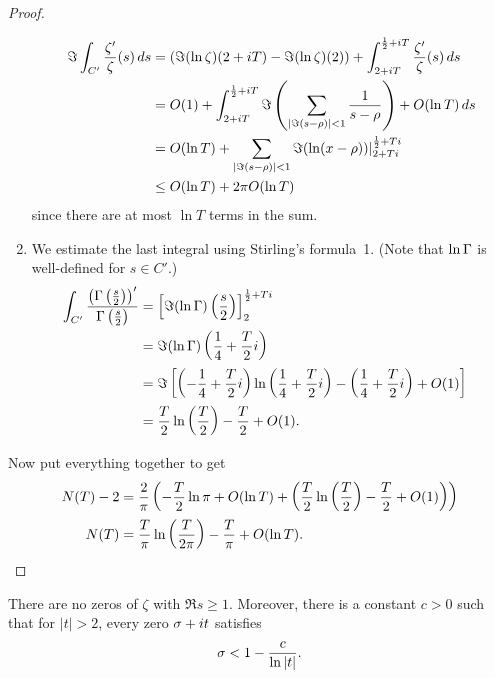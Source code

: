 \begin{proof}
\begin{enumerate}
\begin{align*}
\Im\int_{C'}\frac{\zeta'}{\zeta}(s)\,ds
&=(\Im(\ln\zeta)(2+iT)-{\Im(\ln\zeta)(2)})+\int_{2+iT}^{\frac{1}{2}+iT} \frac{\zeta'}{\zeta}(s)\,ds\\
&=O(1)+\int_{2+iT}^{\frac{1}{2}+iT} \Im\left( {\sum_{|\Im(s-\rho)|<1}\frac{1}{s-\rho}} \right)+O(\ln T)\,ds\\
&=O(\ln T)+\sum_{|\Im(s-\rho)|<1}\Im(\ln(x-\rho))|^{\frac{1}{2}+Ti}_{2+Ti}\\
&\le O(\ln T)+2\pi O(\ln T)
\end{align*}
since there are at most $\ln T$ terms in the sum.
\item We estimate the last integral using Stirling's formula~1. (Note that $\ln\Gamma$ is well-defined for $s\in C'$.)
\begin{align*}
\int_{C'}\frac{\pa{\Ga\pf s2}'}{\Ga\pf s2}
&=\ba{\Im(\ln\Ga)\pf s2}^{\rc 2+Ti}_2\\
&=\Im(\ln \Ga)\pa{\frac 14+\frac{T}{2}i}\\
&=\Im\ba{\pa{-\rc 4+\frac T2i}\ln\pa{\rc 4+\frac T2i}-\pa{\rc 4+\frac T2i}+O(1)}\\%
&=\frac T2\ln\pf T2-\frac T2+O(1).&\qedhere
\end{align*}
\end{enumerate}
Now put everything together to get
\begin{align*}
N(T)-2&=\frac{2}{\pi}\left( {-\frac T2\ln \pi+O(\ln T)+\left( {\frac T2\ln\left( {\frac{T}{2}} \right)-\frac T2+O(1)} \right)} \right)\\
N(T)&=\frac{T}{\pi}\ln\left( {\frac{T}{2\pi}} \right)-\frac{T}{\pi}+O(\ln T).
\end{align*}
\end{proof}
\begin{thm}
There are no zeros of $\zeta$ with $\Re s\ge 1$. Moreover, there is a constant $c>0$ such that for $|t|>2$, every zero $\sigma+it$ satisfies
\[
\sigma<1-\frac{c}{\ln|t|}.
\]
\end{thm}
